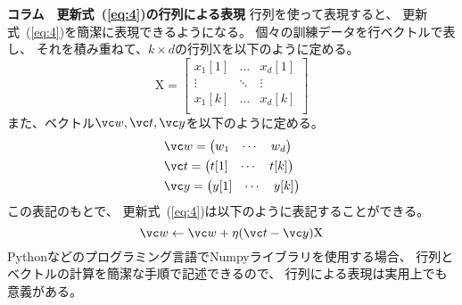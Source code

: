 \newpage
\begin{itembox}{\bf コラム　更新式~(\ref{eq:4})の行列による表現}
  行列を使って表現すると、
  更新式~(\ref{eq:4})を簡潔に表現できるようになる。
  個々の訓練データを行ベクトルで表し、
  それを積み重ねて、$k \times d$の行列$\mathrm X$を以下のように定める。
  \[
      \mathrm X =
      \begin{bmatrix}
        x_1[1] & \dots & x_d[1] \\
        \vdots & \ddots & \vdots \\
        x_1[k] & \dots & x_d[k] \\
      \end{bmatrix}
  \]
  また、ベクトル$\vc w, \vc t, \vc y$を以下のように定める。
  \begin{align*}
    &
      \vc w = \begin{pmatrix} w_1 & \cdots & w_d \end{pmatrix}
    \\&
      \vc t = \begin{pmatrix} t[1] & \cdots & t[k] \end{pmatrix}
    \\&
      \vc y = \begin{pmatrix} y[1] & \cdots & y[k] \end{pmatrix}
  \end{align*}
  この表記のもとで、
  更新式~(\ref{eq:4})は以下のように表記することができる。
  \[
    \vc w \leftarrow
    \vc w + \eta(\vc t - \vc y) \mathrm X
  \]
  Pythonなどのプログラミング言語でNumpyライブラリを使用する場合、
  行列とベクトルの計算を簡潔な手順で記述できるので、
  行列による表現は実用上でも意義がある。
\end{itembox}

\newpage

